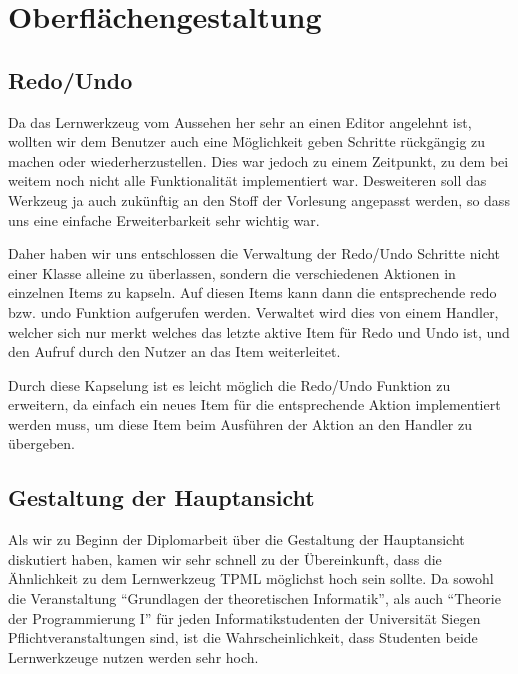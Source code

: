 

\chapter{Oberflächengestaltung}\label{GUI}


\section{Redo/Undo}

Da das Lernwerkzeug vom Aussehen her sehr an einen Editor angelehnt ist,
wollten wir dem Benutzer auch eine Möglichkeit geben Schritte rückgängig zu
machen oder wiederherzustellen. Dies war jedoch zu einem Zeitpunkt, zu dem bei
weitem noch nicht alle Funktionalität implementiert war. Desweiteren soll das
Werkzeug ja auch zukünftig an den Stoff der Vorlesung angepasst werden, so dass
uns eine einfache Erweiterbarkeit sehr wichtig war.\vspace{10pt}

Daher haben wir uns entschlossen die Verwaltung der Redo/Undo Schritte nicht
einer Klasse alleine zu überlassen, sondern die verschiedenen Aktionen in
einzelnen Items zu kapseln. Auf diesen Items kann dann die entsprechende redo
bzw. undo Funktion aufgerufen werden. Verwaltet wird dies von einem Handler,
welcher sich nur merkt welches das letzte aktive Item für Redo und Undo ist,
und den Aufruf durch den Nutzer an das Item weiterleitet.\vspace{10pt}

Durch diese Kapselung ist es leicht möglich die Redo/Undo Funktion zu
erweitern, da einfach ein neues Item für die entsprechende Aktion implementiert
werden muss, um diese Item beim Ausführen der Aktion an den Handler zu
übergeben.


\section{Gestaltung der Hauptansicht}

Als wir zu Beginn der Diplomarbeit über die Gestaltung der Hauptansicht
diskutiert haben, kamen wir sehr schnell zu der Übereinkunft, dass die
Ähnlichkeit zu dem Lernwerkzeug TPML möglichst hoch sein sollte. Da sowohl die
Veranstaltung "`Grundlagen der theoretischen Informatik"', als auch "`Theorie
der Programmierung I"' für jeden Informatikstudenten der Universität Siegen
Pflichtveranstaltungen sind, ist die Wahrscheinlichkeit, dass Studenten beide
Lernwerkzeuge nutzen werden sehr hoch.\vspace{10pt}

